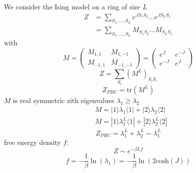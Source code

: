 \documentclass[a4paper]{book}
\theoremstyle{definition}
\theoremstyle{remark}
\begin{document}
We consider the Ising model on a ring of size $L$
\begin{equation}
    \begin{aligned}
        Z &= \sum_{S_1,\dots, S_L}  e^{JS_1S_2}\dots e^{JS_LS_1} \\
        &= \sum_{S_1, \dots, S_L} M_{S_1S_2}\dots M_{S_LS_1}
    \end{aligned}
\end{equation}
with 
\begin{equation}
    M = \begin{pmatrix}
        M_{1,1} & M_{1,-1} \\ M_{-1,1} & M_{-1,-1} 
    \end{pmatrix} = \begin{pmatrix}
        e^J & e^{-J} \\ e^{-J} & e^J
    \end{pmatrix}
\end{equation}
\begin{equation}
    Z = \sum_{S_i} (M^L)_{S_iS_i}
\end{equation}
\begin{equation}
    Z_{PBC} = \text{tr}(M^L)
\end{equation}
$M$ is real symmetric zith eigenvalues $\lambda_1 \geq \lambda_2$
\begin{equation}
    \begin{aligned}
        &M = |1\rangle \lambda_1 \langle 1 | + |2\rangle \lambda_2 \langle 2| \\ 
        &M = |1\rangle \lambda_1^L \langle 1 | + |2\rangle \lambda_2^L \langle 2|
    \end{aligned}
\end{equation}
\begin{equation}
    Z_{PBC} = \lambda_1^L + \lambda_2^L \sim \lambda_1^L
\end{equation}
free energy density $f$: 
\begin{equation}
    Z \sim e^{-\beta L f}
\end{equation}
\begin{equation}
    f = -\frac{1}{\beta}\ln(\lambda_1) = -\frac{1}{\beta}\ln(2 \text{cosh}(J))
\end{equation}
\end{document}

